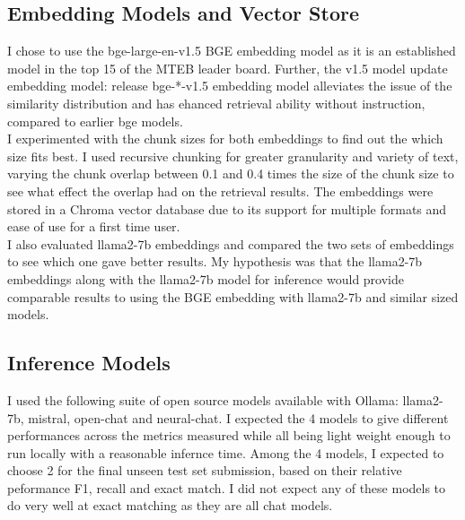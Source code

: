 \documentclass[11pt]{article}
\begin{document}
\subsection{Embedding Models and Vector Store}
I chose to use the bge-large-en-v1.5 BGE embedding model as it is an established model in the top 15 of the MTEB leader board. Further, the v1.5 model update embedding model: release bge-*-v1.5 embedding model alleviates the issue of the similarity distribution and has ehanced retrieval ability without instruction, compared to earlier bge models.
\\
I experimented with the chunk sizes for both embeddings to find out the which size fits best.
I used recursive chunking for greater granularity and variety of text, varying the chunk overlap between 0.1 and 0.4 times the size of the chunk size to see what effect the overlap had on the retrieval results.  The embeddings were stored in a Chroma vector database due to its support for multiple formats and ease of use for a first time user.
\\
I also evaluated llama2-7b embeddings and compared the two sets of embeddings to see which one gave better results. My hypothesis was that the llama2-7b embeddings along with the llama2-7b model for inference would provide comparable results to using the BGE embedding with llama2-7b and similar sized models.
\subsection{Inference Models}
I used the following suite of open source models available with Ollama: llama2-7b, mistral, open-chat and neural-chat. I expected the 4 models to give different performances across the metrics measured while all being light weight enough to run locally with a reasonable infernce time.
Among the 4 models, I expected to choose 2 for the final unseen test set submission, based on their relative peformance F1, recall and exact match. I did not expect any of these models to do very well at exact matching as they are all chat models.


\end{document}
